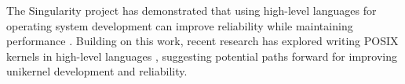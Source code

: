 \documentclass[conference]{IEEEtran}
\begin{document}
The Singularity project has demonstrated that using high-level languages for operating system development can improve reliability while maintaining performance \cite{singularity}. Building on this work, recent research has explored writing POSIX kernels in high-level languages \cite{go_kernel}, suggesting potential paths forward for improving unikernel development and reliability.




\end{document}
